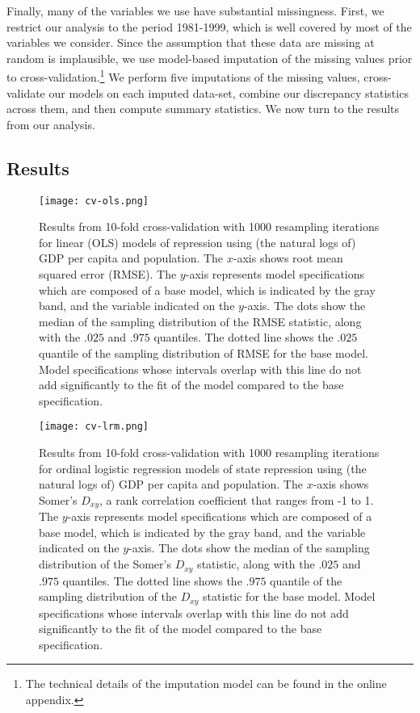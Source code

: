 \documentclass[11pt]{article}
\begin{document}
Finally, many of the variables we use have substantial missingness. First, we restrict our analysis to the period 1981-1999, which is well covered by most of the variables we consider. Since the assumption that these data are missing at random is implausible, we use model-based imputation of the missing values prior to cross-validation.\footnote{The technical details of the imputation model can be found in the online appendix.} We perform five imputations of the missing values, cross-validate our models on each imputed data-set, combine our discrepancy statistics across them, and then compute summary statistics. We now turn to the results from our analysis.

\subsection*{Results}

\begin{figure}[!htpb]
\centering
\texttt{[image: cv-ols.png]}
\caption{Results from 10-fold cross-validation with 1000 resampling iterations for linear (OLS) models of repression using (the natural logs of) GDP per capita and population. The $x$-axis shows root mean squared error (RMSE). The $y$-axis represents model specifications which are composed of a base model, which is indicated by the gray band, and the variable indicated on the $y$-axis. The dots show the median of the sampling distribution of the RMSE statistic, along with the $.025$ and $.975$ quantiles. The dotted line shows the $.025$ quantile of the sampling distribution of RMSE for the base model. Model specifications whose intervals overlap with this line do not add significantly to the fit of the model compared to the base specification.}
\label{fig:cv-ols}
\end{figure}

\begin{figure}[!htpb]
\centering
\texttt{[image: cv-lrm.png]}
\caption{Results from 10-fold cross-validation with 1000 resampling iterations for ordinal logistic regression models of state repression using (the natural logs of) GDP per capita and population. The $x$-axis shows Somer's $D_{xy}$, a rank correlation coefficient that ranges from -1 to 1. The $y$-axis represents model specifications which are composed of a base model, which is indicated by the gray band, and the variable indicated on the $y$-axis. The dots show the median of the sampling distribution of the Somer's $D_{xy}$ statistic, along with the $.025$ and $.975$ quantiles. The dotted line shows the $.975$ quantile of the sampling distribution of the $D_{xy}$ statistic for the base model. Model specifications whose intervals overlap with this line do not add significantly to the fit of the model compared to the base specification.}
\label{fig:cv-lrm}
\end{figure}
\end{document}
